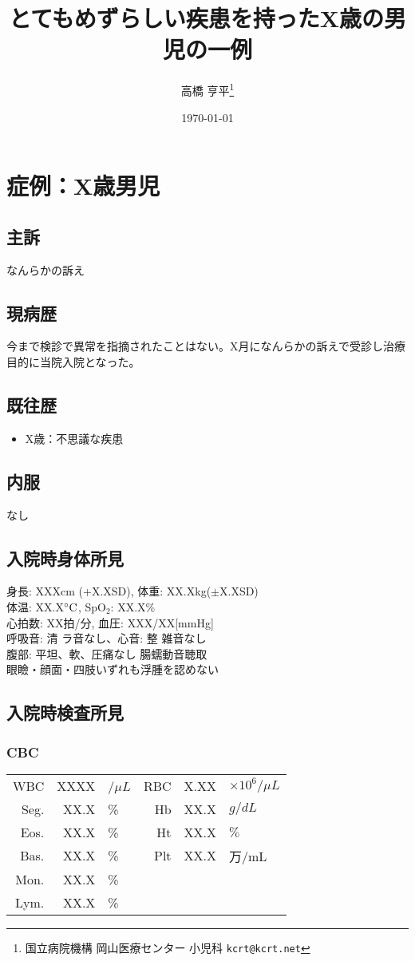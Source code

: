 \documentclass[a4j, twocolumn, 10pt]{jsarticle}
\title{とてもめずらしい疾患を持ったX歳の男児の一例}
\author{高橋 亨平\thanks{国立病院機構 岡山医療センター 小児科 \texttt{kcrt@kcrt.net}}}
\date{\today}
\begin{document}
\maketitle
\section{症例：X歳男児}
\subsection*{主訴}
なんらかの訴え
\subsection*{現病歴}
今まで検診で異常を指摘されたことはない。X月になんらかの訴えで受診し治療目的に当院入院となった。

\subsection*{既往歴}
\begin{itemize}
\setlength{\itemsep}{0cm}
\item X歳：不思議な疾患
\end{itemize}
\subsection*{内服}
なし
\subsection*{入院時身体所見}
\noindent
身長: XXXcm (+X.XSD), 体重: XX.Xkg($\pm$X.XSD)\\
体温: XX.X$^{\circ}{\rm C}$, SpO$_{2}$: XX.X\% \\
心拍数: XX拍/分, 血圧: XXX/XX[mmHg]\\
呼吸音: 清 ラ音なし、心音: 整 雑音なし\\
腹部: 平坦、軟、圧痛なし 腸蠕動音聴取\\
眼瞼・顔面・四肢いずれも浮腫を認めない
\subsection*{入院時検査所見}
\subsubsection*{CBC}
\begin{tabular}[thb]{rrl|rrl}
WBC & XXXX & /$\mu L$ & RBC & X.XX & $\times 10^{6}/\mu L$ \\
 Seg. & XX.X & \% & Hb & XX.X & $g/dL$ \\
 Eos. & XX.X & \% & Ht & XX.X & $\%$ \\
 Bas. & XX.X & \% & Plt & XX.X & 万/mL \\
 Mon. & XX.X & \% & & \\
 Lym. & XX.X & \% & & \\
\end{tabular}
\end{document}
